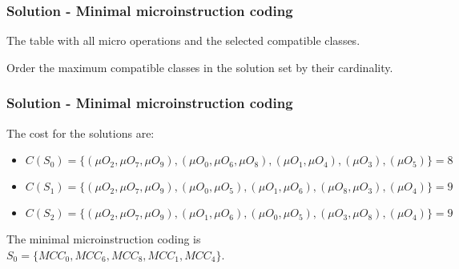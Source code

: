 \begin{frame}
    \frametitle{Solution - Minimal microinstruction coding}
    The table with all micro operations and the selected compatible classes.
    \begin{table}
    \end{table}
    Order the maximum compatible classes in the solution set by their cardinality.
\end{frame}


\begin{frame}
    \frametitle{Solution - Minimal microinstruction coding}
    The cost for the solutions are:
    \begin{itemize}
        \item $C(S_{0}) = \{ (\mu O_{2}, \mu O_{7}, \mu O_{9}), (\mu O_{0}, \mu O_{6}, \mu O_{8}), (\mu O_{1}, \mu O_{4}), (\mu O_{3}), (\mu O_{5}) \} = 8$
        \item $C(S_{1}) = \{ (\mu O_{2}, \mu O_{7}, \mu O_{9}), (\mu O_{0}, \mu O_{5}), (\mu O_{1}, \mu O_{6}), (\mu O_{8}, \mu O_{3}), (\mu O_{4})  \} = 9$
        \item $C(S_{2}) = \{ (\mu O_{2}, \mu O_{7}, \mu O_{9}), (\mu O_{1}, \mu O_{6}), (\mu O_{0}, \mu O_{5}), (\mu O_{3}, \mu O_{8}), (\mu O_{4}) \} = 9$
    \end{itemize}
    The minimal microinstruction coding is $S_{0} = \{MCC_{0}, MCC_{6}, MCC_{8}, MCC_{1}, MCC_{4}\}$.
\end{frame}